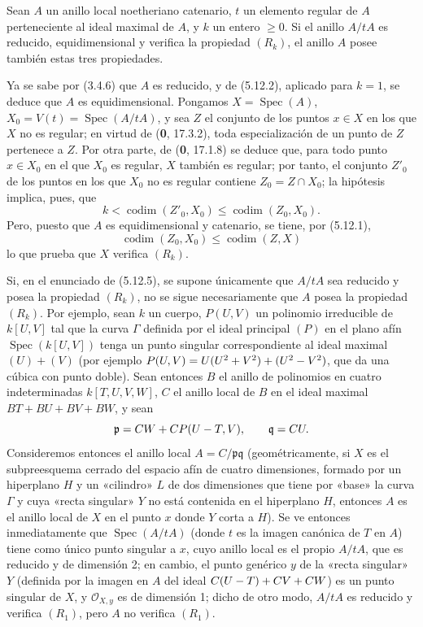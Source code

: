 \begin{proposition}[5.12.5]
\label{IV.2.s5.12.5-fr}
Sean $A$ un anillo local noetheriano catenario, $t$ un elemento regular de $A$
perteneciente al ideal maximal de $A$, y $k$ un entero $\geq0$. Si el anillo
$A/tA$ es reducido, equidimensional y verifica la propiedad $(R_k)$, el anillo
$A$ posee también estas tres propiedades.
\end{proposition}

Ya se sabe por (3.4.6) que $A$ es reducido, y de (5.12.2), aplicado para
$k=1$, se deduce que $A$ es equidimensional. Pongamos
$X=\operatorname{Spec}(A)$, $X_0=V(t)=\operatorname{Spec}(A/tA)$, y sea $Z$
el conjunto de los puntos $x\in X$ en los que $X$ no es regular; en virtud de
(\textbf{0}, 17.3.2), toda especialización de un punto de $Z$ pertenece a $Z$. Por otra
parte, de (\textbf 0, 17.1.8) se deduce que, para todo punto $x\in X_0$ en el que $X_0$
es regular, $X$ también es regular; por tanto, el conjunto $Z'_0$ de los puntos
en los que $X_0$ no es regular contiene $Z_0=Z\cap X_0$; la hipótesis implica,
pues, que
\[
k<\operatorname{codim}(Z'_0,X_0)\leq\operatorname{codim}(Z_0,X_0).
\]
Pero, puesto que $A$ es equidimensional y catenario, se tiene, por (5.12.1),
\[
\operatorname{codim}(Z_0,X_0)\leq\operatorname{codim}(Z,X)
\]
lo que prueba que $X$ verifica $(R_k)$.

\begin{remark}[5.12.6]
\label{IV.2.s5.12.6-fr}
Si, en el enunciado de (5.12.5), se supone únicamente que $A/tA$ sea reducido y
posea la propiedad $(R_k)$, no se sigue necesariamente que $A$ posea la
propiedad $(R_k)$. Por ejemplo, sean $k$ un cuerpo, $P(U,V)$ un polinomio
irreducible de $k[U,V]$ tal que la curva $\Gamma$ definida por el ideal
principal $(P)$ en el plano afín $\operatorname{Spec}(k[U,V])$ tenga un punto
singular correspondiente al ideal maximal $(U)+(V)$ (por ejemplo
$P(U,V)=U(U^2+V^2)+(U^2- V^2)$, que da una cúbica con punto doble). Sean entonces
$B$ el anillo de polinomios en cuatro indeterminadas $k[T,U,V,W]$, $C$ el anillo
local de $B$ en el ideal maximal $BT+BU+BV+BW$, y sean
\[
\mathfrak p=CW+CP(U- T,V),\qquad \mathfrak q=CU.
\]
Consideremos entonces el anillo local $A=C/\mathfrak p\mathfrak q$
(geométricamente, si $X$ es el subpreesquema cerrado del espacio afín de cuatro
dimensiones, formado por un hiperplano $H$ y un «cilindro» $L$ de dos dimensiones
que tiene por «base» la curva $\Gamma$ y cuya «recta singular» $Y$ no está
contenida en el hiperplano $H$, entonces $A$ es el anillo local de $X$ en el
punto $x$ donde $Y$ corta a $H$). Se ve entonces inmediatamente que
$\operatorname{Spec}(A/tA)$ (donde $t$ es la imagen canónica de $T$ en $A$)
tiene como único punto singular a $x$, cuyo anillo local es el propio $A/tA$,
que es reducido y de dimensión 2; en cambio, el punto genérico $y$ de la
«recta singular» $Y$ (definida por la imagen en $A$ del ideal
$C(U- T)+CV+CW$) es un punto singular de $X$, y
$\mathcal O_{X,y}$ es de dimensión 1; dicho de otro modo, $A/tA$ es reducido y
verifica $(R_1)$, pero $A$ no verifica $(R_1)$.
\end{remark}

